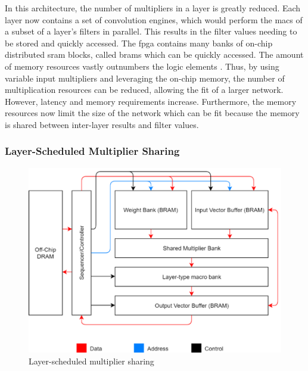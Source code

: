 \documentclass{uw-ece-wkrpt}
\begin{document}
In this architecture, the number of multipliers in a layer is greatly reduced. Each layer now contains a set of convolution engines, which would perform the \glspl{mac} of a subset of a layer's \glspl{filter} in parallel. This results in the \gls{filter} values needing to be stored and quickly accessed. The \gls{fpga} contains many banks of on-chip distributed \gls{sram} blocks, called \glspl{bram} which can be quickly accessed. The amount of memory resources vastly outnumbers the logic elements \cite{Intel-Corp.2018IntelR-ArriaR-1}. Thus, by using variable input multipliers and leveraging the on-chip memory, the number of multiplication resources can be reduced, allowing the fit of a larger network. However, latency and memory requirements increase. Furthermore, the memory resources now limit the size of the network which can be fit because the memory is shared between inter-layer results and \gls{filter} values.

\subsubsection{Layer-Scheduled Multiplier Sharing}

\begin{figure}
    \centering
    \includegraphics[width=\textwidth]{figures/layer-scheduled_multiplier}
    \caption{Layer-scheduled multiplier sharing \cite{Ma2017An-automatic-RT}}\label{fig:layer_scheduled_multiplier}
\end{figure}
\end{document}
